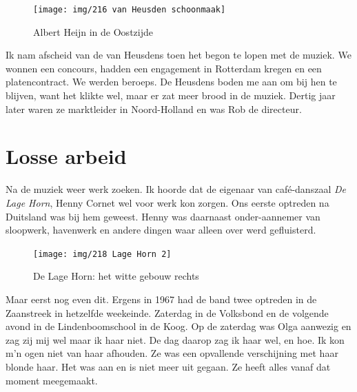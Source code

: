 \documentclass[10pt,twoside, openright]{memoir}
\begin{document}
\begin{figure}
\texttt{[image: img/216 van Heusden schoonmaak]}
\caption*{\footnotesize Albert Heijn in de Oostzijde}
\end{figure}

Ik nam afscheid van de van Heusdens toen het begon te lopen met de muziek. We wonnen een concours, hadden een engagement in Rotterdam kregen en een platencontract. We werden beroeps. De Heusdens boden me aan om bij hen te blijven, want het klikte wel, maar er zat meer brood in de muziek. Dertig jaar later waren ze marktleider in Noord-Holland en was Rob de directeur.

\section{Losse arbeid} %
\label{cha:lossearbeid}

Na de muziek weer werk zoeken. Ik hoorde dat de eigenaar van café-danszaal \emph{De Lage Horn}, Henny Cornet wel voor werk kon zorgen. Ons eerste optreden na Duitsland was bij hem geweest. Henny was daarnaast onder-aannemer van sloopwerk, havenwerk en andere dingen waar alleen over werd gefluisterd. 

\begin{figure}
\texttt{[image: img/218 Lage Horn 2]}
\caption*{\footnotesize De Lage Horn: het witte gebouw rechts}
\end{figure}

Maar eerst nog even dit. Ergens in 1967 had de band twee optreden in de Zaanstreek in hetzelfde weekeinde. Zaterdag in de Volksbond en de volgende avond in de Lindenboomschool in de Koog. Op de zaterdag was Olga aanwezig en zag zij mij wel maar ik haar niet. De dag daarop zag ik haar wel, en hoe. Ik kon m'n ogen niet van haar afhouden. Ze was een opvallende verschijning met haar blonde haar. Het was aan en is niet meer uit gegaan. Ze heeft alles vanaf dat moment meegemaakt.
\end{document}
